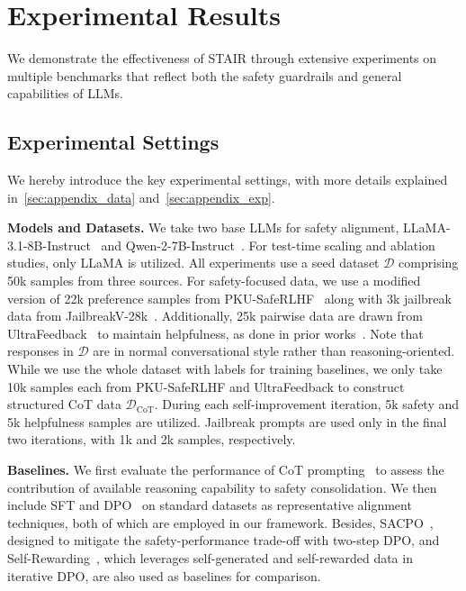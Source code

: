 \section{Experimental Results}
We demonstrate the effectiveness of STAIR through extensive experiments on multiple benchmarks that reflect both the safety guardrails and general capabilities of LLMs. 

\subsection{Experimental Settings}

We hereby introduce the key experimental settings, with more details explained in~\cref{sec:appendix_data} and~\ref{sec:appendix_exp}.


\textbf{Models and Datasets.} We take two base LLMs for safety alignment, LLaMA-3.1-8B-Instruct~\cite{dubey2024llama} and Qwen-2-7B-Instruct~\cite{qwen2}. For test-time scaling and ablation studies, only LLaMA is utilized. All experiments use a seed dataset $\mathcal{D}$ comprising 50k samples from three sources. For safety-focused data, we use a modified version of 22k preference samples from PKU-SafeRLHF~\cite{ji2024pku} along with 3k jailbreak data from JailbreakV-28k~\cite{luo2024jailbreakv}. Additionally, 25k pairwise data are drawn from UltraFeedback~\cite{cui2024ultrafeedback} to maintain helpfulness, as done in prior works~\cite{qi2024safety,wu2024thinking}. Note that responses in $\mathcal{D}$ are in normal conversational style rather than reasoning-oriented. While we use the whole dataset with labels for training baselines, we only take 10k samples each from PKU-SafeRLHF and UltraFeedback to construct structured CoT data $\mathcal{D}_{\text{CoT}}$. During each self-improvement iteration, 5k safety and 5k helpfulness samples are utilized. Jailbreak prompts are used only in the final two iterations, with 1k and 2k samples, respectively.

\textbf{Baselines.} We first evaluate the performance of CoT prompting~\cite{wei2022chain} to assess the contribution of available reasoning capability to safety consolidation. We then include SFT and DPO~\cite{rafailov2024direct} on standard datasets as representative alignment techniques, both of which are employed in our framework. Besides, SACPO~\cite{wachi2024stepwise}, designed to mitigate the safety-performance trade-off with two-step DPO, and Self-Rewarding~\cite{yuanself}, which leverages self-generated and self-rewarded data in iterative DPO, are also used as baselines for comparison.


